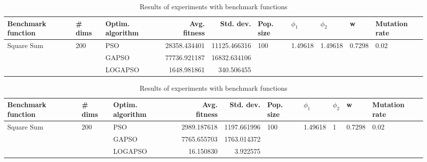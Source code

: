 \documentclass{article}
\begin{document}
\begin{table}
\centering
\caption{Results of experiments with benchmark functions}
\begin{tabular}{lllrrlllll}
\toprule
         Benchmark function &              \# dims & Optim. algorithm &  Avg. fitness &    Std. dev. &            Pop. size &               $\phi_{1}$ &               $\phi_{2}$ &                       w &         Mutation rate \\
\midrule
\multirow{3}{*}{Square Sum} & \multirow{3}{*}{200} &              PSO &  28358.434401 & 11125.466316 & \multirow{3}{*}{100} & \multirow{3}{*}{1.49618} & \multirow{3}{*}{1.49618} & \multirow{3}{*}{0.7298} & \multirow{3}{*}{0.02} \\
                            &                      &            GAPSO &  77736.921187 & 16832.634106 &                      &                          &                          &                         &                       \\
                            &                      &          LOGAPSO &   1648.981861 &   340.506455 &                      &                          &                          &                         &                       \\
\bottomrule
\end{tabular}
\end{table}
\begin{table}
\centering
\caption{Results of experiments with benchmark functions}
\begin{tabular}{lllrrlllll}
\toprule
         Benchmark function &              \# dims & Optim. algorithm &  Avg. fitness &   Std. dev. &            Pop. size &               $\phi_{1}$ &         $\phi_{2}$ &                       w &         Mutation rate \\
\midrule
\multirow{3}{*}{Square Sum} & \multirow{3}{*}{200} &              PSO &   2989.187618 & 1197.661996 & \multirow{3}{*}{100} & \multirow{3}{*}{1.49618} & \multirow{3}{*}{1} & \multirow{3}{*}{0.7298} & \multirow{3}{*}{0.02} \\
                            &                      &            GAPSO &   7765.655703 & 1763.014372 &                      &                          &                    &                         &                       \\
                            &                      &          LOGAPSO &     16.150830 &    3.922575 &                      &                          &                    &                         &                       \\
\bottomrule
\end{tabular}
\end{table}
\end{document}
